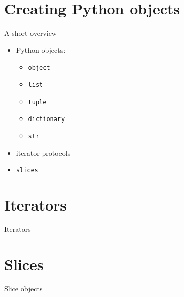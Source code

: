 
\section{Creating Python objects}
\begin{frame}{A short overview}
    \begin{itemize}
        \item Python objects: 
            \begin{itemize}
                \item \texttt{object}
                \item \texttt{list}
                \item \texttt{tuple}
                \item \texttt{dictionary}
                \item \texttt{str}
            \end{itemize}
        \item iterator protocols
        \item \texttt{slices}
    \end{itemize}
\end{frame}


\section{Iterators}
\begin{frame}{Iterators}

\end{frame}


\section{Slices}
\begin{frame}{Slice objects}

\end{frame}
